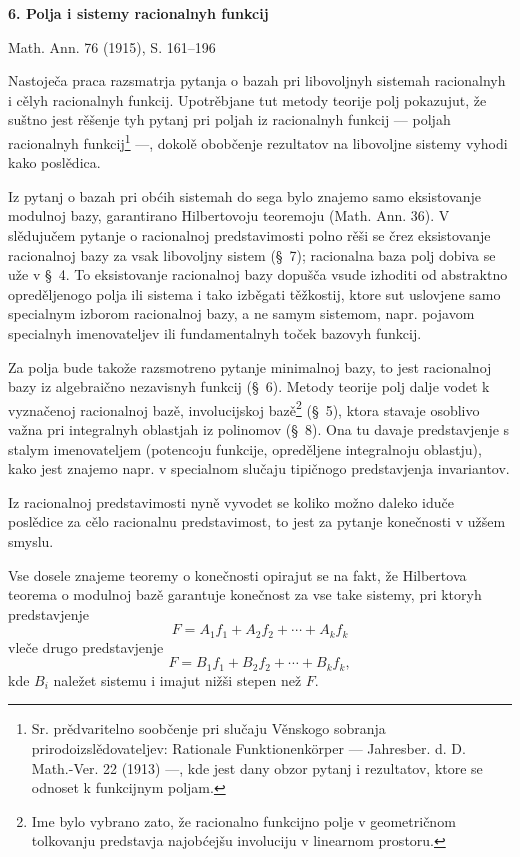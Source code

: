 \documentclass[11pt]{article}
\begin{document}
\begin{center}
{\Large\bfseries 6. Polja i sistemy racionalnyh funkcij}\par
\vspace{1.2em}
Math. Ann. 76 (1915), S. 161--196
\end{center}

\vspace{2em}

Nastoječa praca razsmatrja pytanja o bazah pri libovoljnyh sistemah racionalnyh i cělyh racionalnyh funkcij. Upotrěbjane tut metody teorije polj pokazujut, že suštno jest rěšenje tyh pytanj pri poljah iz racionalnyh funkcij --- poljah racionalnyh funkcij\footnote{Sr. prědvaritelno soobčenje pri slučaju Věnskogo sobranja prirodoizslědovateljev: Rationale Funktionenkörper --- Jahresber. d. D. Math.-Ver. 22 (1913) ---, kde jest dany obzor pytanj i rezultatov, ktore se odnoset k funkcijnym poljam.} ---, dokolě obobčenje rezultatov na libovoljne sistemy vyhodi kako poslědica.

Iz pytanj o bazah pri obćih sistemah do sega bylo znajemo samo eksistovanje modulnoj bazy, garantirano Hilbertovoju teoremoju (Math. Ann. 36). V slědujučem pytanje o racionalnoj predstavimosti polno rěši se črez eksistovanje racionalnoj bazy za vsak libovoljny sistem (\S\ 7); racionalna baza polj dobiva se uže v \S\ 4. To eksistovanje racionalnoj bazy dopušča vsude izhoditi od abstraktno opreděljenogo polja ili sistema i tako izběgati těžkostij, ktore sut uslovjene samo specialnym izborom racionalnoj bazy, a ne samym sistemom, napr. pojavom specialnyh imenovateljev ili fundamentalnyh toček bazovyh funkcij.

Za polja bude takože razsmotreno pytanje minimalnoj bazy, to jest racionalnoj bazy iz algebraično nezavisnyh funkcij (\S\ 6). Metody teorije polj dalje vodet k vyznačenoj racionalnoj bazě, involucijskoj bazě\footnote{Ime bylo vybrano zato, že racionalno funkcijno polje v geometričnom tolkovanju predstavja najobćejšu involuciju v linearnom prostoru.} (\S\ 5), ktora stavaje osoblivo važna pri integralnyh oblastjah iz polinomov (\S\ 8). Ona tu davaje predstavjenje s stalym imenovateljem (potencoju funkcije, opreděljene integralnoju oblastju), kako jest znajemo napr. v specialnom slučaju tipičnogo predstavjenja invariantov.

Iz racionalnoj predstavimosti nyně vyvodet se koliko možno daleko iduče poslědice za cělo racionalnu predstavimost, to jest za pytanje konečnosti v užšem smyslu.

Vse dosele znajeme teoremy o konečnosti opirajut se na fakt, že Hilbertova teorema o modulnoj bazě garantuje konečnost za vse take sistemy, pri ktoryh predstavjenje
\[
  F=A_1f_1+A_2f_2+\cdots+A_kf_k
\]
vleče drugo predstavjenje
\[
  F=B_1f_1+B_2f_2+\cdots+B_kf_k,
\]
kde $B_i$ naležet sistemu i imajut nižši stepen než $F$.
\end{document}
